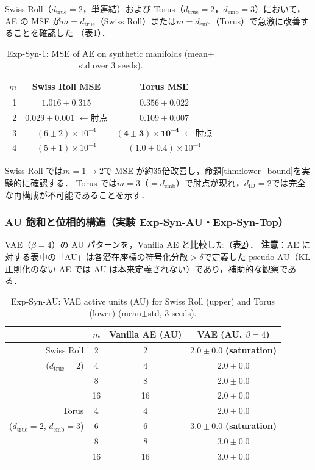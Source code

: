 \documentclass[11pt,a4paper]{jsarticle}
\newcommand{\dID}{d_{\mathrm{ID}}}
\newcommand{\dtrue}{d_{\mathrm{true}}}
\newcommand{\demb}{d_{\mathrm{emb}}}
\begin{document}
Swiss Roll（$\dtrue = 2$，単連結）および Torus（$\dtrue = 2$，$\demb = 3$）において，
AE の MSE が$m = \dtrue$（Swiss Roll）または$m = \demb$（Torus）で急激に改善することを確認した
（表\ref{tab:e1}）．

\begin{table}[H]
\centering
\caption{Exp-Syn-1: MSE of AE on synthetic manifolds (mean$\pm$std over 3 seeds).}
\label{tab:e1}
\small
\begin{tabular}{rcc}
\toprule
$m$ & Swiss Roll MSE & Torus MSE \\
\midrule
1 & $1.016\pm0.315$ & $0.356\pm0.022$ \\
2 & $\boldsymbol{0.029\pm0.001}$ $\leftarrow$肘点 & $0.109\pm0.007$ \\
3 & $(6\pm2)\times10^{-4}$ & $\boldsymbol{(4\pm3)\times10^{-4}}$ $\leftarrow$肘点 \\
4 & $(5\pm1)\times10^{-4}$ & $(1.0\pm0.4)\times10^{-4}$ \\
\bottomrule
\end{tabular}
\end{table}

Swiss Roll では$m = 1 \to 2$で MSE が約35倍改善し，命題\ref{thm:lower_bound}を実験的に確認する．
Torus では$m = 3$（$= \demb$）で肘点が現れ，$\dID = 2$では完全な再構成が不可能であることを示す．

\subsubsection{AU 飽和と位相的構造（実験 Exp-Syn-AU・Exp-Syn-Top）}

VAE（$\beta = 4$）の AU パターンを，Vanilla AE と比較した（表\ref{tab:ea_summary}）．
\textbf{注意}：AE に対する表中の「AU」は各潜在座標の符号化分散$> \delta$で定義した
pseudo-AU（KL 正則化のない AE では AU は本来定義されない）であり，補助的な観察である．

\begin{table}[H]
\centering
\caption{Exp-Syn-AU: VAE active units (AU) for Swiss Roll (upper) and Torus (lower) (mean$\pm$std, 3 seeds).}
\label{tab:ea_summary}
\small
\begin{tabular}{rccc}
\toprule
 & $m$ & Vanilla AE (AU) & VAE (AU, $\beta=4$) \\
\midrule
Swiss Roll & 2 & 2 & $2.0\pm0.0$ \textbf{(saturation)} \\
($d_\mathrm{true}=2$) & 4 & 4 & $2.0\pm0.0$ \\
 & 8 & 8 & $2.0\pm0.0$ \\
 & 16 & 16 & $2.0\pm0.0$ \\
\midrule
Torus & 4 & 4 & $2.0\pm0.0$ \\
($d_\mathrm{true}=2$, $d_\mathrm{emb}=3$) & 6 & 6 & $3.0\pm0.0$ \textbf{(saturation)} \\
 & 8 & 8 & $3.0\pm0.0$ \\
 & 16 & 16 & $3.0\pm0.0$ \\
\bottomrule
\end{tabular}
\end{table}
\end{document}
